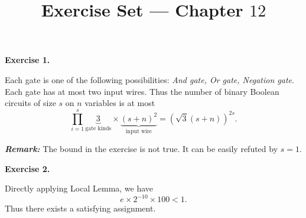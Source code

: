 \documentclass[a4paper]{article}
\title{Exercise Set --- Chapter $12$}
\date{}
\newenvironment{exercise}[1]{
	\par
	\noindent\textbf{Exercise #1.}\quad
}{
	\par
	\bigskip
}
\newcommand{\pbra}[1]{\left( #1 \right)}
\begin{document}
\maketitle

\begin{exercise}{1}
    Each gate is one of the following possibilities: \emph{And gate, Or gate, Negation gate}. Each gate has at most two input wires. Thus the number of binary Boolean circuits of size $s$ on $n$ variables is at most
    $$
    \prod_{i=1}^s\underbrace{3}_{\text{gate kinds}}\times\underbrace{(s+n)^2}_{\text{input wire}}
    =\pbra{\sqrt3(s+n)}^{2s}.
    $$

\end{exercise}
\noindent\textbf{\it Remark:} The bound in the exercise is not true. It can be easily refuted by $s=1$.

\begin{exercise}{2}
    Directly applying Local Lemma, we have
    $$
    e\times 2^{-10}\times 100<1.
    $$
    Thus there exists a satisfying assignment.
\end{exercise}
\end{document}
